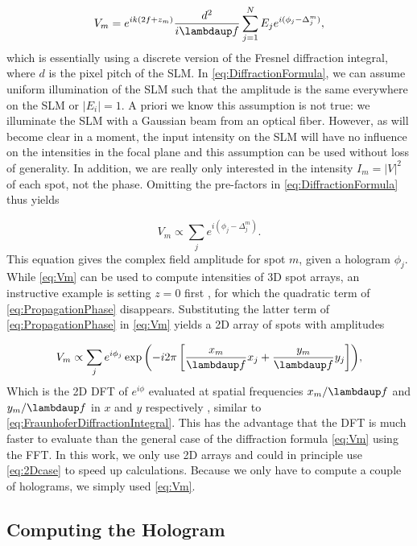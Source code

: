 \begin{equation}\label{eq:DiffractionFormula}
    V_m = e^{i k \left(2 f + z_m\right)}
    \frac{d^2}{i \lambdaup f} \sum_{j=1}^N E_j e^{i(\phi_j - \Delta_j^m)},
\end{equation}
which is essentially using a discrete version of the Fresnel diffraction integral, where $d$ is the pixel pitch of the SLM. 
In \cref{eq:DiffractionFormula}, we can assume uniform illumination of the SLM such that the amplitude is the same everywhere on the SLM or $|E_i| = 1$.
A priori we know this assumption is not true: we illuminate the SLM with a Gaussian beam from an optical fiber.
However, as will become clear in a moment, the input intensity on the SLM will have no influence on the intensities in the focal plane and this assumption can be used without loss of generality.
In addition, we are really only interested in the intensity $I_m =|V|^2$ of each spot, not the phase.
Omitting the pre-factors in \cref{eq:DiffractionFormula} thus yields

\begin{equation}\label{eq:Vm}
    V_m \propto \sum_{j} e^{i(\phi_j - \Delta_j^m)}.
\end{equation}
This equation gives the complex field amplitude for spot $m$, given a hologram $\phi_j$.
While \cref{eq:Vm} can be used to compute intensities of 3D spot arrays, an instructive example is setting $z=0$ first \cite{DiLeonardo2007}, for which the quadratic term of \cref{eq:PropagationPhase} disappears.
Substituting the latter term of \cref{eq:PropagationPhase} in \cref{eq:Vm} yields a 2D array of spots with amplitudes 

\begin{equation}\label{eq:2Dcase}
    V_m \propto \sum_j e^{i\phi_j} \exp{\left(
    - i 2\pi \left[
    \frac{x_m}{\lambdaup f} x_j + \frac{y_m}{\lambdaup f} y_j
    \right]
    \right)},
\end{equation}
Which is the 2D \ac{DFT} of $e^{i\phi}$ evaluated at spatial frequencies $x_m/\lambdaup f$ and $y_m/\lambdaup f$ in $x$ and $y$ respectively \cite{DiLeonardo2007,Bijnen2015}, similar to \cref{eq:FraunhoferDiffractionIntegral}.
This has the advantage that the DFT is much faster to evaluate than the general case of the diffraction formula \cref{eq:Vm} using the \ac{FFT}.
In this work, we only use 2D arrays and could in principle use \cref{eq:2Dcase} to speed up calculations.
Because we only have to compute a couple of holograms, we simply used \cref{eq:Vm}.

\subsection{Computing the Hologram}\label{sec:GSW}

